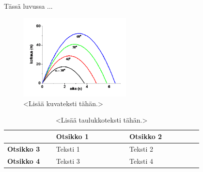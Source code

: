 Tässä luvussa ...

\begin{figure}[ht!]
  \centering
  \includegraphics[width=0.5\textwidth]{assets/good-example.png}
  \caption{<Lisää kuvateksti tähän.>}
  \label{fig:kuvaesimerkki}
\end{figure}

\begin{table}[ht!]
  \centering
  \caption{<Lisää taulukkoteksti tähän.>}
  \label{tab:taulukkoesimerkki}
  \begin{tabular}{p{0.2\linewidth} | p{0.3\linewidth} | p{0.3\linewidth}}
    \hline
    & \textbf{Otsikko 1} & \textbf{Otsikko 2} \\
    \hline
    \textbf{Otsikko 3} & Teksti 1 & Teksti 2\\
    \hline
    \textbf{Otsikko 4} & Teksti 3 & Teksti 4\\
    \hline
  \end{tabular}
\end{table}

\parencite{nawar_multi-heuristic_2014}

\parencite{zhang_test_2007}